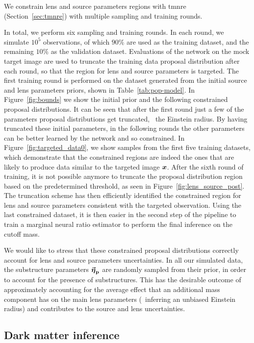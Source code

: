 We constrain lens and source parameters regions with \gls*{tmnre} (Section~\ref{sec:tmnre}) with multiple sampling and training rounds.

In total, we perform six sampling and training rounds. In each round, we simulate $10^5$ observations, of which $90\%$ are used as the training dataset, and the remaining $10\%$ as the validation dataset. Evaluations of the network on the mock target image are used to truncate the training data proposal distribution after each round, so that the region for lens and source parameters is targeted. The first training round is performed on the dataset generated from the initial source and lens parameters priors, shown in Table~\ref{tab:pop-model}. In Figure~\ref{fig:bounds} we show the initial prior and the following constrained proposal distributions. It can be seen that after the first round just a few of the parameters proposal distributions get truncated, \eg~the Einstein radius. By having truncated these initial parameters, in the following rounds the other parameters can be better learned by the network and so constrained. In Figure~\ref{fig:targeted_data0}, we show samples from the first five training datasets, which demonstrate that the constrained regions are indeed the ones that are likely to produce data similar to the targeted image $\bm{x}$. After the sixth round of training, it is not possible anymore to truncate the proposal distribution region based on the predetermined threshold, as seen in Figure~\ref{fig:lens_source_post}. The truncation scheme has then efficiently identified the constrained region for lens and source parameters consistent with the targeted observation. Using the last constrained dataset, it is then easier in the second step of the pipeline to train a marginal neural ratio estimator to perform the final inference on the cutoff mass.

We would like to stress that these constrained proposal distributions correctly account for lens and source parameters uncertainties. In all our simulated data, the substructure parameters $\boldsymbol{\vec{{\bm{\eta}}}_\mathrm{p}}$ are randomly sampled from their prior, in order to account for the presence of substructures. This has the desirable outcome of approximately accounting for the average effect that an additional mass component has on the main lens parameters (\eg\ inferring an unbiased Einstein radius) and contributes to the source and lens uncertainties.

\subsection{Dark matter inference}
\label{subsec:dm}

